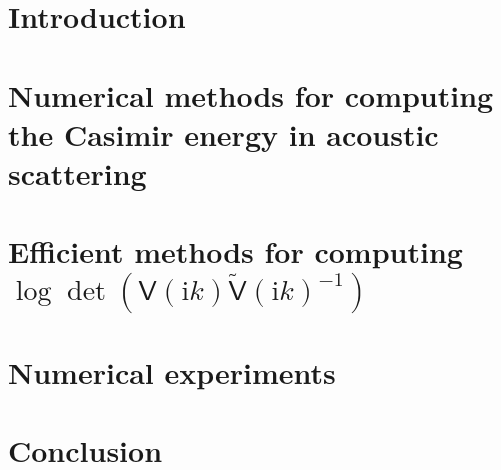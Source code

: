 \documentclass[review]{elsarticle}
\begin{document}
\section{Introduction}\label{Introduction}


\section{Numerical methods for computing the Casimir energy  in acoustic scattering}\label{Numerical methods for computing the Casimir energy}


\section{Efficient methods for computing $\log\det(\mathsf{V}(\mathrm{i}k)\tilde{\mathsf{V}}(\mathrm{i}k)^{-1})$}\label{Krylov subspace for generalized eigenvalue problem}


\section{Numerical experiments}\label{Numerical experiments}


\section{Conclusion}\label{Conclusion}





\end{document}
